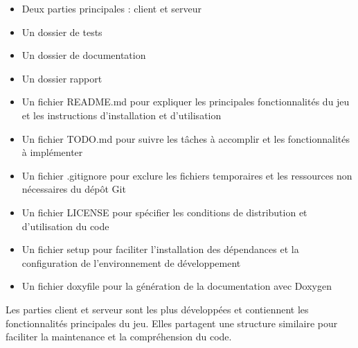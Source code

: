 \documentclass[12pt,a4paper]{article}
\begin{document}
        \begin{itemize}
            \item Deux parties principales : client et serveur
            \item Un dossier de tests
            \item Un dossier de documentation
            \item Un dossier rapport 
            \item Un fichier README.md pour expliquer les principales fonctionnalités du jeu et les instructions d'installation et d'utilisation
            \item Un fichier TODO.md pour suivre les tâches à accomplir et les fonctionnalités à implémenter
            \item Un fichier .gitignore pour exclure les fichiers temporaires et les ressources non nécessaires du dépôt Git
            \item Un fichier LICENSE pour spécifier les conditions de distribution et d'utilisation du code
            \item Un fichier setup pour faciliter l'installation des dépendances et la configuration de l'environnement de développement
            \item Un fichier doxyfile pour la génération de la documentation avec Doxygen
        \end{itemize}

        \vspace{0.5cm}

        Les parties client et serveur sont les plus développées et contiennent les fonctionnalités principales du jeu. 
        Elles partagent une structure similaire pour faciliter la maintenance et la compréhension du code.

        \vspace{0.5cm}
\end{document}
